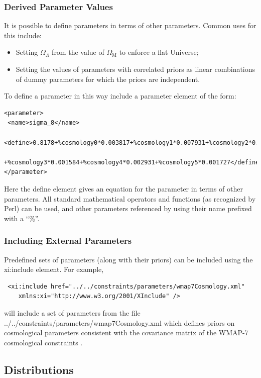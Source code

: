\subsubsection{Derived Parameter Values}

It is possible to define parameters in terms of other parameters. Common uses for this include:
\begin{itemize}
 \item Setting $\Omega_\Lambda$ from the value of $\Omega_{\mathrm M}$ to enforce a flat Universe;
 \item Setting the values of parameters with correlated priors as linear combinations of dummy parameters for which the priors are independent.
\end{itemize}
To define a parameter in this way include a {\normalfont \ttfamily parameter} element of the form:
\begin{verbatim}
<parameter>
 <name>sigma_8</name>
 <define>0.8178+%cosmology0*0.003817+%cosmology1*0.007931+%cosmology2*0.01002
    +%cosmology3*0.001584+%cosmology4*0.002931+%cosmology5*0.001727</define>
</parameter>
\end{verbatim}
Here the {\normalfont \ttfamily define} element gives an equation for the parameter in terms of other parameters. All standard mathematical operators and functions (as recognized by Perl) can be used, and other parameters referenced by using their name prefixed with a ``\%''.

\subsubsection{Including External Parameters}

Predefined sets of parameters (along with their priors) can be included using the {\normalfont \ttfamily xi:include} element. For example,
\begin{verbatim}
 <xi:include href="../../constraints/parameters/wmap7Cosmology.xml"
    xmlns:xi="http://www.w3.org/2001/XInclude" />
\end{verbatim}
will include a set of parameters from the file {\normalfont \ttfamily ../../constraints/parameters/wmap7Cosmology.xml} which defines priors on cosmological parameters consistent with the covariance matrix of the WMAP-7 cosmological constraints \citep{komatsu_seven-year_2010}.

\subsection{Distributions}

